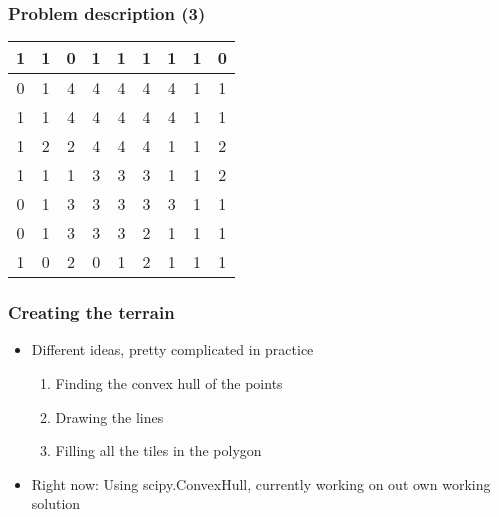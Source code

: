 \documentclass{beamer}
\begin{document}
\begin{frame}
    \frametitle{Problem description (3)}

    \begin{tabular}{|c|c|c|c|c|c|c|c|c|}
            \hline
        \cellcolor{black!10}1&\cellcolor{black!10}1&0&\cellcolor{black!10}1&\cellcolor{black!10}1&\cellcolor{black!10}1&\cellcolor{black!10}1&\cellcolor{black!10}1&0\\
            \hline
        0&\cellcolor{black!10}1&\cellcolor{blue!25}4&\cellcolor{blue!25}4&\cellcolor{blue!25}4&\cellcolor{blue!25}4&\cellcolor{blue!25}4&\cellcolor{black!10}1&\cellcolor{black!10}1\\
            \hline  
        \cellcolor{black!10}1&\cellcolor{black!10}1&\cellcolor{blue!25}4&\cellcolor{blue!25}4&\cellcolor{blue!25}4&\cellcolor{blue!25}4&\cellcolor{blue!25}4&\cellcolor{black!10}1&\cellcolor{black!10}1\\
            \hline    
        \cellcolor{black!10}1&\cellcolor{red!25}2&\cellcolor{red!25}2&\cellcolor{blue!25}4&\cellcolor{blue!25}4&\cellcolor{blue!25}4&\cellcolor{black!10}1&\cellcolor{black!10}1&\cellcolor{red!25}2\\
            \hline
        \cellcolor{black!10}1&\cellcolor{black!10}1&\cellcolor{black!10}1&\cellcolor{green!25}3&\cellcolor{green!25}3&\cellcolor{green!25}3&\cellcolor{black!10}1&\cellcolor{black!10}1&\cellcolor{red!25}2\\
            \hline
        0&\cellcolor{black!10}1&\cellcolor{green!25}3&\cellcolor{green!25}3&\cellcolor{green!25}3&\cellcolor{green!25}3&\cellcolor{green!25}3&\cellcolor{black!10}1&\cellcolor{black!10}1\\
            \hline
        0&\cellcolor{black!10}1&\cellcolor{green!25}3&\cellcolor{green!25}3&\cellcolor{green!25}3&\cellcolor{red!25}2&\cellcolor{black!10}1&\cellcolor{black!10}1&\cellcolor{black!10}1\\
            \hline
        \cellcolor{black!10}1&0&\cellcolor{red!25}2&0&\cellcolor{black!10}1&\cellcolor{red!25}2&\cellcolor{black!10}1&\cellcolor{black!10}1&\cellcolor{black!10}1\\              
            \hline
    \end{tabular} 
\end{frame}

\begin{frame}
    \frametitle{Creating the terrain}
    \begin{itemize}
        \item Different ideas, pretty complicated in practice
            \begin{enumerate}
                \item Finding the convex hull of the points
                \item Drawing the lines
                \item Filling all the tiles in the polygon
            \end{enumerate}
        \item Right now: Using scipy.ConvexHull, currently working on out own working solution
    \end{itemize}
\end{frame}
\end{document}
